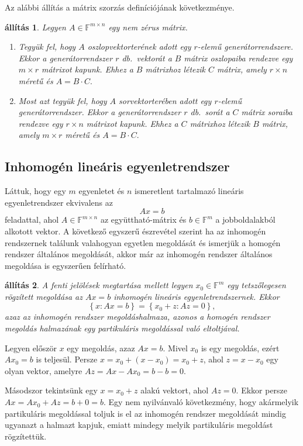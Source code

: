 \documentclass[a4paper, showtrims]{memoir}
\makeatletter
\renewenvironment{proof}[1][\proofname]
    {\par\pushQED{\qed}%
    \normalfont \topsep6\p@\@plus6\p@\relax
    \trivlist
    \item[\hskip\labelsep
        \itshape
    #1\@addpunct{:}]\ignorespaces}
    {\popQED\endtrivlist\@endpefalse}
\theoremstyle{plain}
\newtheorem{proposition}{állítás}[chapter]
\theoremstyle{remark}
\theoremstyle{definition}
\makeatother
\begin{document}
Az alábbi állítás a mátrix szorzás definíciójának következménye.
\begin{proposition}
	Legyen $A\in\mathbb{F}^{m\times n}$ egy nem zérus mátrix.
	\begin{enumerate}
		\item
		      Tegyük fel, hogy $A$ oszlopvektorterének adott egy $r$-elemű generátorrendszere.
		      Ekkor a generátorrendszer $r$ db.~vektorát a $B$ mátrix oszlopaiba rendezve egy $m\times r$ mátrixot kapunk.
		      Ehhez a $B$ mátrixhoz létezik $C$ mátrix, amely $r\times n$ méretű és
		      \(
		      A=B\cdot C.
		      \)
		\item
		      Most azt tegyük fel, hogy $A$ sorvektorterében adott egy $r$-elemű generátorrendszer.
		      Ekkor a generátorrendszer $r$ db.~sorát a $C$ mátrix soraiba rendezve egy $r\times n$ mátrixot kapunk.
		      Ehhez a $C$ mátrixhoz létezik $B$ mátrix, amely $m\times r$ méretű és
		      \(
		      A=B\cdot C.
		      \)
              \qedhere
	\end{enumerate}
\end{proposition}

\subsection{Inhomogén lineáris egyenletrendszer}
Láttuk, hogy egy $m$ egyenletet és $n$ ismeretlent tartalmazó lineáris egyenletrendszer ekvivalens az
\[
	Ax=b
\]
feladattal, ahol $A\in\mathbb{F}^{m\times n}$ az együttható-mátrix és $b\in\mathbb{F}^m$
a jobboldalakból alkotott vektor.
A következő egyszerű észrevétel szerint ha az inhomogén rendszernek találunk valahogyan egyetlen megoldását és ismerjük a homogén rendszer általános megoldását,
akkor már az inhomogén rendszer általános megoldása is egyszerűen felírható.
\begin{proposition}
	A fenti jelölések megtartása mellett
	legyen $x_0\in\mathbb{F}^m$ egy tetszőlegesen rögzített megoldása az $Ax=b$ inhomogén lineáris egyenletrendszernek.
	Ekkor
	\[
		\left\{ x:Ax=b \right\}
		=
		\left\{ x_0+z:Az=0 \right\},
	\]
	azaz az inhomogén rendszer megoldáshalmaza,
	azonos a homogén rendszer megoldás halmazának egy partikuláris megoldással való
	eltoltjával.
\end{proposition}
\begin{proof}
	Legyen először $x$ egy megoldás, azaz $Ax=b$.
	Mivel $x_0$ is egy megoldás, ezért $Ax_{0}=b$ is teljesül.
	Persze $x=x_0+\left( x-x_0 \right)=x_0+z$, ahol $z=x-x_0$ egy olyan vektor,
	amelyre $Az=Ax-Ax_0=b-b=0$.

	Másodszor tekintsünk egy $x=x_0+z$ alakú vektort, ahol $Az=0$.
	Ekkor persze $Ax=Ax_0+Az=b+0=b$.
\end{proof}
Egy nem nyilvánvaló következmény,
hogy akármelyik partikuláris megoldással toljuk is el az
inhomogén rendszer megoldását mindig ugyanazt a halmazt kapjuk,
emiatt mindegy melyik partikuláris megoldást rögzítettük.
\end{document}
